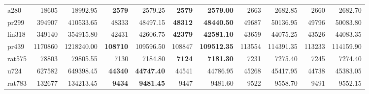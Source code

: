 \begin{table}[tp]
\begin{tabular}{lrrrrrrrrrr}
    a280 & 18605 & 18992.95 & \textbf{2579} & 2579.25 & \textbf{2579} & \textbf{2579.00} & 2663 & 2682.85 & 2660 & 2682.70 \\
    pr299 & 394907 & 410533.65 & 48333 & 48497.15 & \textbf{48312} & \textbf{48440.50} & 49687 & 50136.95 & 49796 & 50083.80 \\
    lin318 & 349140 & 354915.80 & 42431 & 42606.75 & \textbf{42379} & \textbf{42581.10} & 43659 & 44075.25 & 43526 & 44083.35 \\
    pr439 & 1170860 & 1218240.00 & \textbf{108710} & 109596.50 & 108847 & \textbf{109512.35} & 113554 & 114391.35 & 113233 & 114159.90 \\
    rat575 & 78803 & 79805.55 & 7130 & 7184.80 & \textbf{7124} & \textbf{7181.30} & 7231 & 7275.40 & 7245 & 7274.40 \\
    u724 & 627582 & 649398.45 & \textbf{44340} & \textbf{44747.40} & 44541 & 44786.95 & 45268 & 45417.95 & 44738 & 45383.05 \\
    rat783 & 132677 & 134213.45 & \textbf{9434} & \textbf{9481.45} & 9447 & 9481.60 & 9522 & 9558.70 & 9491 & 9552.15 \\
    \bottomrule
  \end{tabular}
\end{table}


